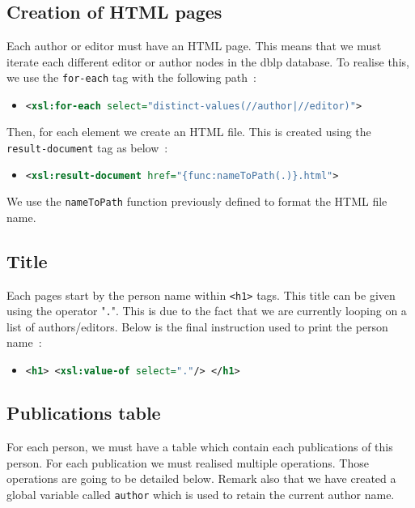 \documentclass{article}
\begin{document}
  \subsection{Creation of HTML pages} 
    Each author or editor must have an HTML page. This means that we must iterate each different editor or author nodes in the dblp database. To realise this, we use the \verb|for-each| tag with the following path~:
    \begin{itemize}
      \item \begin{lstlisting}[language=XML]
<xsl:for-each select="distinct-values(//author|//editor)">\end{lstlisting}
    \end{itemize}
    Then, for each element we create an HTML file. This is created using the \verb|result-document| tag as below~:
    \begin{itemize}
      \item \begin{lstlisting}[language=XML]
<xsl:result-document href="{func:nameToPath(.)}.html">\end{lstlisting}
    \end{itemize}
    We use the \verb|nameToPath| function previously defined to format the HTML file name.

  \subsection{Title}
    Each pages start by the person name within \verb|<h1>| tags. This title can be given using the operator "\verb|.|". This is due to the fact that we are currently looping on a list of authors/editors. Below is the final instruction used to print the person name~:
    \begin{itemize}
      \item \begin{lstlisting}[language=XML]
<h1> <xsl:value-of select="."/> </h1>\end{lstlisting}
    \end{itemize}

  \subsection{Publications table}
    For each person, we must have a table which contain each publications of this person. For each publication we must realised multiple operations. Those operations are going to be detailed below. Remark also that we have created a global variable called \verb|author| which is used to retain the current author name.
\end{document}
